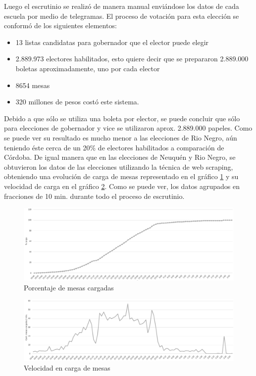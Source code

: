 Luego el escrutinio se realizó de manera manual enviándose los datos de cada escuela por medio de telegramas. El proceso de votación para esta elección se conformó de los siguientes elementos: 
\begin{itemize}
    \item 13 listas candidatas para gobernador que el elector puede elegir
    \item 2.889.973 electores habilitados, esto quiere decir que se prepararon 2.889.000 boletas aproximadamente, uno por cada elector
    \item 8654 mesas
    \item 320 millones de pesos costó este sistema. 
\end{itemize}
Debido a que sólo se utiliza una boleta por elector, se puede concluir que sólo para elecciones de gobernador y vice se utilizaron aprox. 2.889.000 papeles. Como se puede ver su resultado es mucho menor a las elecciones de Rio Negro, aún teniendo éste cerca de un 20\% de electores habilitados a comparación de Córdoba. De igual manera que en las elecciones de Neuquén y Rio Negro, se obtuvieron los datos de las elecciones utilizando la técnica de web scraping, obteniendo una evolución de carga de mesas representado en el gráfico \ref{graf:porcentajeCordoba} y su velocidad de carga en el gráfico \ref{graf:velocidadCordoba}. Como se puede ver, los datos agrupados en fracciones de 10 min. durante todo el proceso de escrutinio.

\begin{figure}[h!]
  \includegraphics[width=1\textwidth]{E4YqKc5Tcu.png}
  \caption{Porcentaje de mesas cargadas}
  \label{graf:porcentajeCordoba}
\end{figure}

\begin{figure}[h!]
  \includegraphics[width=1\textwidth]{9rEiyqeSFw.png}
  \caption{Velocidad en carga de mesas}
  \label{graf:velocidadCordoba}
\end{figure}

